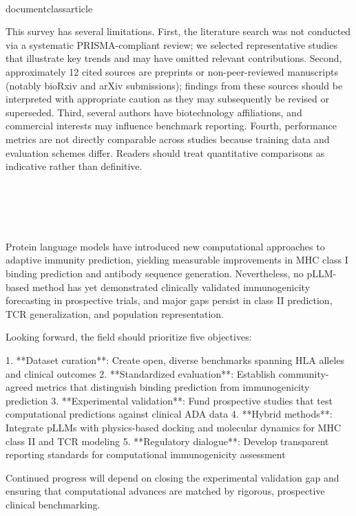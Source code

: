 \\documentclass{article}
\begin{document}
This survey has several limitations. First, the literature search was not conducted via a systematic PRISMA-compliant review; we selected representative studies that illustrate key trends and may have omitted relevant contributions. Second, approximately 12 cited sources are preprints or non-peer-reviewed manuscripts (notably bioRxiv and arXiv submissions); findings from these sources should be interpreted with appropriate caution as they may subsequently be revised or superseded. Third, several authors have biotechnology affiliations, and commercial interests may influence benchmark reporting. Fourth, performance metrics are not directly comparable across studies because training data and evaluation schemes differ. Readers should treat quantitative comparisons as indicative rather than definitive.

\section{}

Protein language models have introduced new computational approaches to adaptive immunity prediction, yielding measurable improvements in MHC class I binding prediction and antibody sequence generation. Nevertheless, no pLLM-based method has yet demonstrated clinically validated immunogenicity forecasting in prospective trials, and major gaps persist in class II prediction, TCR generalization, and population representation.

Looking forward, the field should prioritize five objectives:

1. **Dataset curation**: Create open, diverse benchmarks spanning HLA alleles and clinical outcomes
2. **Standardized evaluation**: Establish community-agreed metrics that distinguish binding prediction from immunogenicity prediction
3. **Experimental validation**: Fund prospective studies that test computational predictions against clinical ADA data
4. **Hybrid methods**: Integrate pLLMs with physics-based docking and molecular dynamics for MHC class II and TCR modeling
5. **Regulatory dialogue**: Develop transparent reporting standards for computational immunogenicity assessment

Continued progress will depend on closing the experimental validation gap and ensuring that computational advances are matched by rigorous, prospective clinical benchmarking.

\section{}
\end{document}
